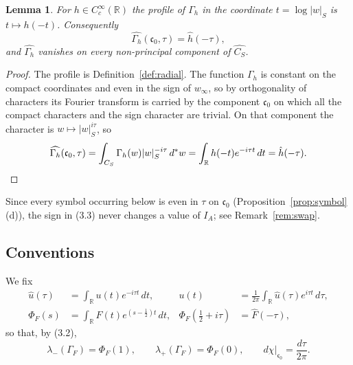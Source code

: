 \documentclass[11pt]{amsart}
\newtheorem{lemma}[theorem]{Lemma}
\theoremstyle{definition}
\theoremstyle{remark}
\newcommand{\R}{\mathbb R}
\newcommand{\CS}{C_S}
\newcommand{\cz}{\mathfrak c_0}
\begin{document}
\begin{lemma}
\label{lem:profile}
For $h\in C_c^\infty(\R)$ the profile of $\Gamma_h$ in the coordinate
$t=\log|w|_S$ is $t\mapsto h(-t)$.  Consequently
\[
  \widehat{\Gamma_h}(\cz,\tau)=\hat h(-\tau),
  \tag{3.3}
\]
and $\widehat{\Gamma_h}$ vanishes on every non-principal component of
$\widehat{\CS}$.
\end{lemma}

\begin{proof}
The profile is Definition~\ref{def:radial}.  The function $\Gamma_h$ is
constant on the compact coordinates and even in the sign of $w_\infty$, so by
orthogonality of characters its Fourier transform is carried by the component
$\cz$ on which all the compact characters and the sign character are trivial.
On that component the character is $w\mapsto|w|_S^{i\tau}$, so
\[
  \widehat{\Gamma_h}(\cz,\tau)=\int_{\CS}\Gamma_h(w)|w|_S^{-i\tau}\,d^*w
  =\int_\R h(-t)e^{-i\tau t}\,dt=\hat h(-\tau).\qedhere
\]
\end{proof}

Since every symbol occurring below is even in $\tau$ on $\cz$
(Proposition~\ref{prop:symbol}(d)), the sign in (3.3) never changes a value of
$I_A$; see Remark~\ref{rem:swap}.

\subsection{Conventions}

We fix
\begin{equation}
\begin{aligned}
  \hat u(\tau)&=\int_\R u(t)e^{-i\tau t}\,dt,
  &u(t)&=\frac1{2\pi}\int_\R\hat u(\tau)e^{i\tau t}\,d\tau,\\
  \Phi_F(s)&=\int_\R F(t)e^{(s-\frac12)t}\,dt,
  &\Phi_F(\tfrac12+i\tau)&=\hat F(-\tau),
\end{aligned}
\tag{3.4}
\end{equation}
so that, by (3.2),
\begin{equation}
  \lambda_-(\Gamma_F)=\Phi_F(1),\qquad \lambda_+(\Gamma_F)=\Phi_F(0),
  \qquad d\chi|_{\cz}=\frac{d\tau}{2\pi}.
\tag{3.5}
\end{equation}
\end{document}
